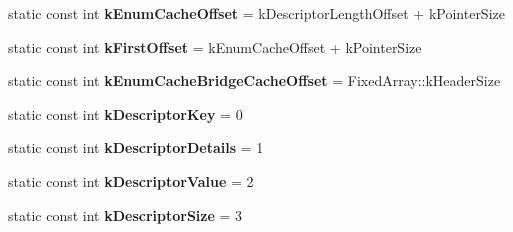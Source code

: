 \begin{DoxyCompactItemize}
\item 
static const int {\bfseries k\+Enum\+Cache\+Offset} = k\+Descriptor\+Length\+Offset + k\+Pointer\+Size\hypertarget{classv8_1_1internal_1_1_descriptor_array_ae113d24b60ad38967081035eeac6814c}{}\label{classv8_1_1internal_1_1_descriptor_array_ae113d24b60ad38967081035eeac6814c}

\item 
static const int {\bfseries k\+First\+Offset} = k\+Enum\+Cache\+Offset + k\+Pointer\+Size\hypertarget{classv8_1_1internal_1_1_descriptor_array_af13deaee1d816c14f74112c3400e3aff}{}\label{classv8_1_1internal_1_1_descriptor_array_af13deaee1d816c14f74112c3400e3aff}

\item 
static const int {\bfseries k\+Enum\+Cache\+Bridge\+Cache\+Offset} = Fixed\+Array\+::k\+Header\+Size\hypertarget{classv8_1_1internal_1_1_descriptor_array_aa51c4630bb6cafb0b90b91ad6ef76544}{}\label{classv8_1_1internal_1_1_descriptor_array_aa51c4630bb6cafb0b90b91ad6ef76544}

\item 
static const int {\bfseries k\+Descriptor\+Key} = 0\hypertarget{classv8_1_1internal_1_1_descriptor_array_a6587e89cced93cbd6b336639350363f1}{}\label{classv8_1_1internal_1_1_descriptor_array_a6587e89cced93cbd6b336639350363f1}

\item 
static const int {\bfseries k\+Descriptor\+Details} = 1\hypertarget{classv8_1_1internal_1_1_descriptor_array_a0ba69adacdf93ff512c22c3ae2e144ff}{}\label{classv8_1_1internal_1_1_descriptor_array_a0ba69adacdf93ff512c22c3ae2e144ff}

\item 
static const int {\bfseries k\+Descriptor\+Value} = 2\hypertarget{classv8_1_1internal_1_1_descriptor_array_a8882801aface5ebfa806fea3b9933fe8}{}\label{classv8_1_1internal_1_1_descriptor_array_a8882801aface5ebfa806fea3b9933fe8}

\item 
static const int {\bfseries k\+Descriptor\+Size} = 3\hypertarget{classv8_1_1internal_1_1_descriptor_array_a410254caab1893829034a59370066eed}{}\label{classv8_1_1internal_1_1_descriptor_array_a410254caab1893829034a59370066eed}

\end{DoxyCompactItemize}
